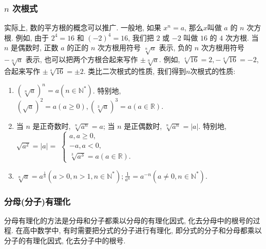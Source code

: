 \subsubsection{$n$ 次根式}
实际上, 数的平方根的概念可以推广. 一般地, 如果 $x^{n}=a$, 那么$x$叫做 $a$ 的 $n$ 次方根. 例如, 由于 $2^4=16$ 和 $(-2)^4=16$, 我们把 $2$ 或 $-2$ 叫做 $16$ 的 $4$ 次方根. 当 $n$ 是偶数时, 正数 $a$ 的正的 $n$ 次方根用符号 $\sqrt[n]{a}$ 表示, 负的 $n$ 次方根用符号 $-\sqrt[n]{a}$ 表示, 也可以把两个方根合起来写作 $\pm \sqrt[n]{a}$. 例如, $\sqrt[4]{16}=2,-\sqrt[4]{16}=-2$, 合起来写作 $\pm \sqrt[4]{16}= \pm 2$.
类比二次根式的性质, 我们得到$n$次根式的性质:
\begin{enumerate}
	\item $(\sqrt[n]{a})^{n}=a\left(n \in \mathbb{N}^*\right)$. 特别地, $(\sqrt{a})^2=a(a \geqslant 0),(\sqrt[3]{a})^3=a(a \in \mathbb{R})$.
	\item 当 $n$ 是正奇数时, $\sqrt[n]{a^n}=a$; 当 $n$ 是正偶数时, $\sqrt[n]{a^n}=|a|$. 特别地, $\sqrt{a^2}=|a|=$ $\left\{\begin{array}{l}a, a \geqslant 0, \\ -a, a<0, \\ \sqrt[3]{a^3}=a(a \in \mathbb{R}) .\end{array}\right.$
	\item $\sqrt[n]{a}=a^{\frac{1}{n}}\left(a>0, n>1, n \in \mathbb{N}^*\right) ; \frac{1}{a^n}=a^{-n}\left(a \neq 0, n \in \mathbb{N}^*\right)$.
\end{enumerate}
\subsubsection{分母(分子)有理化}
分母有理化的方法是分母和分子都乘以分母的有理化因式, 化去分母中的根号的过程. 在高中数学中, 有时需要把分式的分子进行有理化, 即分式的分子和分母都乘以分子的有理化因式, 化去分子中的根号.

